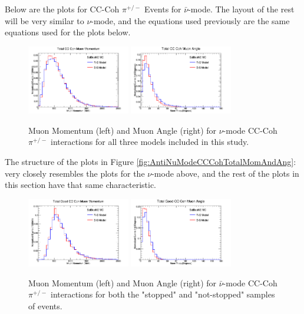 \documentclass[11pt]{article}
\begin{document}
Below are the plots for CC-Coh $\pi^{+/-}$ Events for $\bar{\nu}$-mode. The layout of the rest will be very similar to $\nu$-mode, and the equations used previously are the same equations used for the plots below.

\begin{figure}[H]
\centering
\includegraphics[width=0.4\textwidth]{CCCohPlots/ANMCCCohTotalMomentum.png}
\includegraphics[width=0.4\textwidth]{CCCohPlots/ANMCCCohTotalAngle.png}
\caption{Muon Momentum (left) and Muon Angle (right) for $\nu$-mode CC-Coh $\pi^{+/-}$ interactions for all three models included in this study.}
\end{figure}\label{fig:AntiNuModeCCCohTotalMomAndAng}

The structure of the plots in Figure \ref*{fig:AntiNuModeCCCohTotalMomAndAng}: very closely resembles the plots for the $\nu$-mode above, and the rest of the plots in this section have that same characteristic.

\begin{figure}[H]
\centering
\includegraphics[width=0.4\textwidth]{CCCohPlots/ANMCCCohGoodMomentum.png}
\includegraphics[width=0.4\textwidth]{CCCohPlots/ANMCCCohGoodAngle.png}
\caption{Muon Momentum (left) and Muon Angle (right) for $\bar{\nu}$-mode CC-Coh $\pi^{+/-}$ interactions for both the "stopped" and "not-stopped" samples of events.}
\end{figure}\label{fig:AntiNuModeCCCohGoodMomAndAng}
\end{document}
